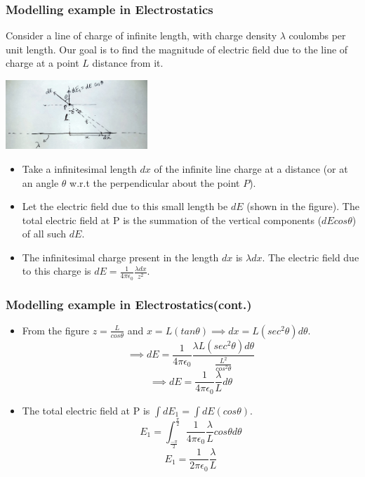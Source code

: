 \documentclass[10pt]{beamer}
\begin{document}
\begin{frame}
    \frametitle{Modelling example in Electrostatics}
    Consider a line of charge of infinite length, with charge density $\lambda$ coulombs per unit length. Our goal is to find the magnitude of electric field due to the line of charge at a point $L$ distance from it.
    \begin{center}
        \includegraphics[height=0.2\textheight,width=0.4\textwidth]{images/electrostats_field_calc.jpeg}
    \end{center}
    \begin{itemize}
        \item Take a infinitesimal length $dx$ of the infinite line charge at a distance (or at an angle $\theta$ w.r.t the perpendicular about the point $P$).
        \item Let the electric field due to this small length be $dE$ (shown in the figure). The total electric field at P is the summation of the vertical components ($dE cos\theta$) of all such $dE$.
        \item The infinitesimal charge present in the length $dx$ is $\lambda dx$. The electric field due to this charge is $dE = \frac{1}{4\pi\epsilon_0} \frac{\lambda dx}{z^2}$.
    \end{itemize}
\end{frame}

\begin{frame}
    \frametitle{Modelling example in Electrostatics(cont.)}
    \begin{itemize}
        \item From the figure $z = \frac{L}{cos\theta}$ and $x = L (tan\theta) \implies dx = L (sec^2\theta) d\theta$.
            $$
            \implies dE = \frac{1}{4\pi\epsilon_0} \frac{\lambda L (sec^2\theta) d\theta}{\frac{L^2}{cos^2\theta}}
            $$
            $$
            \implies dE = \frac{1}{4\pi\epsilon_0} \frac{\lambda}{L} d\theta
            $$
        \item The total electric field at P is $\int dE_1 = \int dE (cos\theta)$.
            $$
            E_1 = \int_{\frac{-\pi}{2}}^{\frac{\pi}{2}} \frac{1}{4\pi\epsilon_0} \frac{\lambda}{L} cos\theta d\theta
            $$
            $$
            \boxed{E_1 = \frac{1}{2\pi\epsilon_0} \frac{\lambda}{L}}
            $$
    \end{itemize}
\end{frame}
\end{document}
